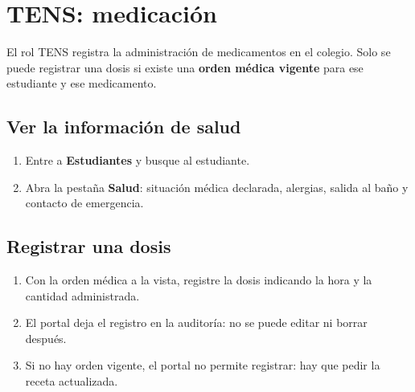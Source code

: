 \section{TENS: medicación}

El rol TENS registra la administración de medicamentos en el colegio. Solo se
puede registrar una dosis si existe una \textbf{orden médica vigente} para ese
estudiante y ese medicamento.

\subsection{Ver la información de salud}

\begin{enumerate}[leftmargin=*,itemsep=0.2em]
\item Entre a \textbf{Estudiantes} y busque al estudiante.
\item Abra la pestaña \textbf{Salud}: situación médica declarada, alergias,
  salida al baño y contacto de emergencia.
\end{enumerate}



\subsection{Registrar una dosis}

\begin{enumerate}[leftmargin=*,itemsep=0.2em]
\item Con la orden médica a la vista, registre la dosis indicando la hora y la
  cantidad administrada.
\item El portal deja el registro en la auditoría: no se puede editar ni
  borrar después.
\item Si no hay orden vigente, el portal no permite registrar: hay que pedir
  la receta actualizada.
\end{enumerate}

